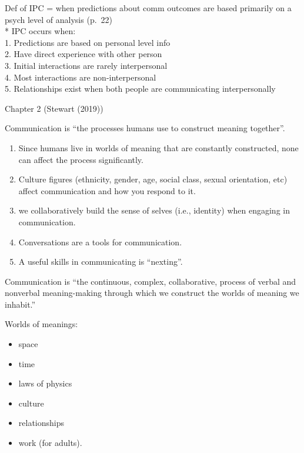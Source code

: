 \documentclass[
]{book}
\providecommand{\tightlist}{%
  \setlength{\itemsep}{0pt}\setlength{\parskip}{0pt}}
\begin{document}
Def of IPC = when predictions about comm outcomes are based primarily on a psych level of analysis (p.~22)\\
* IPC occurs when:\\
1. Predictions are based on personal level info\\
2. Have direct experience with other person\\
3. Initial interactions are rarely interpersonal\\
4. Most interactions are non-interpersonal\\
5. Relationships exist when both people are communicating interpersonally

Chapter 2 (Stewart (2019))

Communication is ``the processes humans use to construct meaning together''.

\begin{enumerate}
\def\labelenumi{\arabic{enumi}.}
\tightlist
\item
  Since humans live in worlds of meaning that are constantly constructed, none can affect the process significantly.\\
\item
  Culture figures (ethnicity, gender, age, social class, sexual orientation, etc) affect communication and how you respond to it.\\
\item
  we collaboratively build the sense of selves (i.e., identity) when engaging in communication.\\
\item
  Conversations are a tools for communication.\\
\item
  A useful skills in communicating is ``nexting''.
\end{enumerate}

Communication is ``the continuous, complex, collaborative, process of verbal and nonverbal meaning-making through which we construct the worlds of meaning we inhabit.''

Worlds of meanings:

\begin{itemize}
\tightlist
\item
  space
\item
  time
\item
  laws of physics\\
\item
  culture
\item
  relationships
\item
  work (for adults).
\end{itemize}
\end{document}
